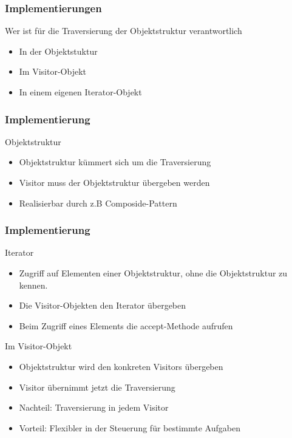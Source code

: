 \begin{frame}
	\frametitle{Implementierungen}
  \begin{block}{Wer ist für die Traversierung der Objektstruktur verantwortlich}
  	\begin{itemize}
  		\item In der Objektstuktur
  		\item Im Visitor-Objekt
  		\item In einem eigenen Iterator-Objekt
  	\end{itemize}
  \end{block}
\end{frame}


\begin{frame}
	\frametitle{Implementierung}
  \begin{block}{Objektstruktur}
  	\begin{itemize}
  		\item Objektstruktur kümmert sich um die Traversierung 
  		\item Visitor muss der Objektstruktur übergeben werden
  		\item Realisierbar durch z.B Composide-Pattern
  	\end{itemize}
  \end{block}
\end{frame}

\begin{frame}
	\frametitle{Implementierung}
  \begin{block}{Iterator}
  	\begin{itemize}
  		\item Zugriff auf Elementen einer Objektstruktur, ohne die  Objektstruktur zu kennen.
  		\item Die Visitor-Objekten den Iterator übergeben
  		\item Beim Zugriff eines Elements die accept-Methode aufrufen

  	\end{itemize}
  \end{block}
	\begin{block}{Im Visitor-Objekt}
  	\begin{itemize}
  		\item Objektstruktur wird den konkreten Visitors übergeben
  		\item Visitor übernimmt jetzt die Traversierung
  		\item Nachteil: Traversierung in jedem Visitor
  		\item Vorteil: Flexibler in der Steuerung für bestimmte Aufgaben

  	\end{itemize}
  \end{block}
\end{frame}


